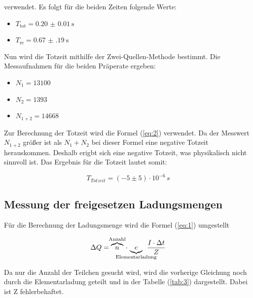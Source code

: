 verwendet. Es folgt für die beiden Zeiten folgende Werte:

\begin{itemize}
  \item $T_\text{tot} = \SI{0.20(1)}{\second}$
  \item $T_\text{re} = \SI{0.67(19)}{\second}$
\end{itemize}

Nun wird die Totzeit mithilfe der Zwei-Quellen-Methode bestimmt.
Die Messaufnahmen für die beiden Präperate ergeben:

\begin{itemize}
  \item $N_1 = 13100$
  \item $N_2 = 1393$
  \item $N_{1+2} = 14668$
\end{itemize}

Zur Berechnung der Totzeit wird die Formel (\ref{eq:2}) verwendet.
Da der Messwert $N_{1+2}$ größer ist als $N_1 + N_2$ bei dieser Formel eine
negative Totzeit herauskommen. Deshalb erigbt sich eine negative Totzeit, was
physikalisch nicht sinnvoll ist.
Das Ergebnis  für die Totzeit lautet somit:

\begin{equation*}
  T_{Totzeit} = (-5 \pm 5) \cdot 10^{-6} \, s
\end{equation*}


\subsection{Messung der freigesetzen Ladungsmengen}

Für die Berechnung der Ladungsmenge wird die Formel (\ref{eq:1}) umgestellt

\begin{equation*}
  \Delta Q =\overbrace{n}^{\mathclap{\text{Anzahl}}} \, \cdot \, \underbrace{e}_{\mathclap{\text{Elementarladung}}}  \,\,\, \frac{I \cdot \Delta t}{Z}
\end{equation*}

Da nur die Anzahl der Teilchen gesucht wird, wird die vorherige Gleichung noch durch die Elementarladung geteilt und in der Tabelle (\ref{tab:3})
dargestellt. Dabei ist Z fehlerbehaftet.

